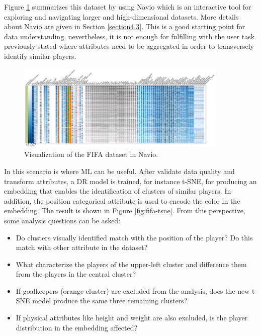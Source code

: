 Figure \ref{fig:fifa-navio} summarizes this dataset by using Navio \cite{Guerra-Gomez2018Navio:Datasets} which is an interactive tool for exploring and navigating larger and high-dimensional datasets. More details about Navio are given in Section \ref{section4.3}. This is a good starting point for data understanding, nevertheless, it is not enough for fulfilling with the user task previously stated where attributes need to be aggregated in order to transversely identify similar players. 

\begin{figure}[ht]
 \centering
 \includegraphics[width=0.9\textwidth]{fifa-navio.png}
 \caption{Visualization of the FIFA dataset in Navio.}
 \label{fig:fifa-navio}
\end{figure}

In this scenario is where ML can be useful. After validate data quality and transform attributes, a DR model is trained, for instance t-SNE, for producing an embedding that enables the identification of clusters of similar players. In addition, the position categorical attribute is used to encode the color in the embedding. The result is shown in Figure \ref{fig:fifa-tsne}. From this perspective, some analysis questions can be asked:

\begin{itemize}
\item Do clusters visually identified match with the position of the player? Do this match with other attribute in the dataset?
\item What characterize the players of the upper-left cluster and difference them from the players in the central cluster?
\item If goalkeepers (orange cluster) are excluded from the analysis, does the new t-SNE model produce the same three remaining clusters?
\item If physical attributes like height and weight are also excluded, is the player distribution in the embedding affected?  
\end{itemize}

